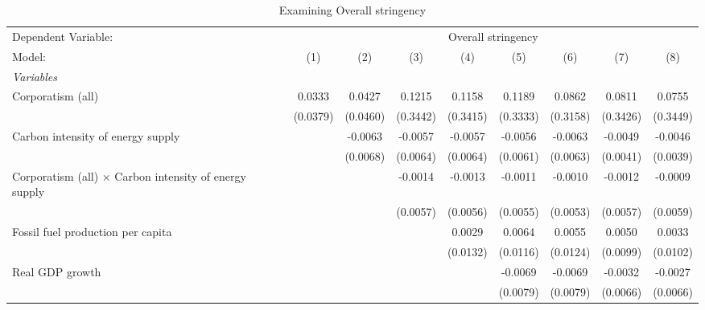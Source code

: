 
\begin{table}[htbp]
   \caption{Examining Overall stringency}
   \centering
   \begin{tabular}{lcccccccc}
      \tabularnewline \midrule \midrule
      Dependent Variable: & \multicolumn{8}{c}{Overall stringency}\\
      Model:                                                        & (1)      & (2)      & (3)      & (4)      & (5)      & (6)      & (7)      & (8)\\  
      \midrule
      \emph{Variables}\\
      Corporatism (all)                                             & 0.0333   & 0.0427   & 0.1215   & 0.1158   & 0.1189   & 0.0862   & 0.0811   & 0.0755\\   
                                                                    & (0.0379) & (0.0460) & (0.3442) & (0.3415) & (0.3333) & (0.3158) & (0.3426) & (0.3449)\\   
      Carbon intensity of energy supply                             &          & -0.0063  & -0.0057  & -0.0057  & -0.0056  & -0.0063  & -0.0049  & -0.0046\\   
                                                                    &          & (0.0068) & (0.0064) & (0.0064) & (0.0061) & (0.0063) & (0.0041) & (0.0039)\\   
      Corporatism (all) $\times$ Carbon intensity of energy supply  &          &          & -0.0014  & -0.0013  & -0.0011  & -0.0010  & -0.0012  & -0.0009\\   
                                                                    &          &          & (0.0057) & (0.0056) & (0.0055) & (0.0053) & (0.0057) & (0.0059)\\   
      Fossil fuel production per capita                             &          &          &          & 0.0029   & 0.0064   & 0.0055   & 0.0050   & 0.0033\\   
                                                                    &          &          &          & (0.0132) & (0.0116) & (0.0124) & (0.0099) & (0.0102)\\   
      Real GDP growth                                               &          &          &          &          & -0.0069  & -0.0069  & -0.0032  & -0.0027\\   
                                                                    &          &          &          &          & (0.0079) & (0.0079) & (0.0066) & (0.0066)\\   

\end{tabular}
\end{table}
